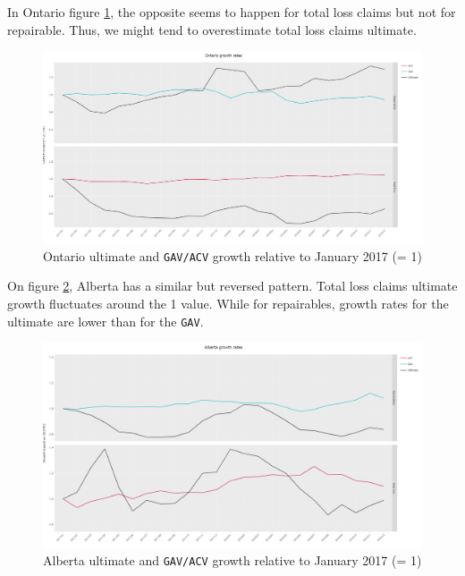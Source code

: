 	In Ontario figure \ref{Fig_ON_growth}, the opposite seems to happen for total loss claims but not for repairable. Thus, we might tend to overestimate total loss claims ultimate.
	\begin{figure}[H]
		\begin{center}
			\includegraphics[scale=0.2]{Graphiques/ON_growth} 
			\renewcommand{\figurename}{Figure}
			\caption{Ontario ultimate and \texttt{GAV/ACV} growth relative to January 2017 (= 1)}\label{Fig_ON_growth}
		\end{center}
	\end{figure}
	On figure \ref{Fig_AB_growth}, Alberta has a similar but reversed pattern. Total loss claims ultimate growth fluctuates around the 1 value. While for repairables, growth rates for the ultimate are lower than for the \texttt{GAV}.  
	\begin{figure}[H]
		\begin{center}
			\includegraphics[scale=0.2]{Graphiques/AB_growth} 
			\renewcommand{\figurename}{Figure}
			\caption{Alberta ultimate and \texttt{GAV/ACV} growth relative to January 2017 (= 1)}\label{Fig_AB_growth}
		\end{center}
	\end{figure}
	

